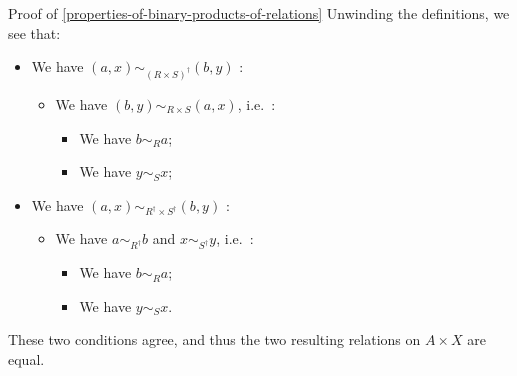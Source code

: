 \begin{Proof}{Proof of \cref{properties-of-binary-products-of-relations}}%
    Unwinding the definitions, we see that:
    \begin{itemize}
        \item We have $(a,x)\sim_{(R\times S)^{\dagger}}(b,y)$ \textiff:
            \begin{itemize}
                \item We have $(b,y)\sim_{R\times S}(a,x)$, i.e.\ \textiff:
                    \begin{itemize}
                        \item We have $b\sim_{R}a$;
                        \item We have $y\sim_{S}x$;
                    \end{itemize}
            \end{itemize}
        \item We have $(a,x)\sim_{R^{\dagger}\times S^{\dagger}}(b,y)$ \textiff:
            \begin{itemize}
                \item We have $a\sim_{R^{\dagger}}b$ and $x\sim_{S^{\dagger}}y$, i.e.\ \textiff:
                    \begin{itemize}
                        \item We have $b\sim_{R}a$;
                        \item We have $y\sim_{S}x$.
                    \end{itemize}
            \end{itemize}
    \end{itemize}
    These two conditions agree, and thus the two resulting relations on $A\times X$ are equal.


\end{Proof}
